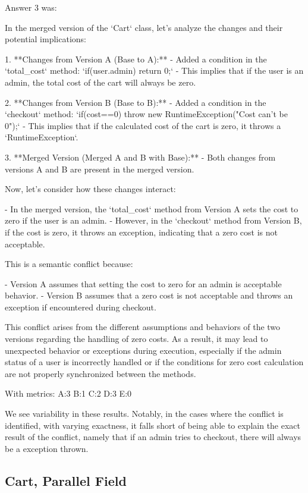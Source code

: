 Answer 3 was:
\begin{spverbatim}
In the merged version of the `Cart` class, let's analyze the changes and their potential implications:

1. **Changes from Version A (Base to A):**
   - Added a condition in the `total_cost` method: `if(user.admin) return 0;`
   - This implies that if the user is an admin, the total cost of the cart will always be zero.

2. **Changes from Version B (Base to B):**
   - Added a condition in the `checkout` method: `if(cost==0) throw new RuntimeException("Cost can't be 0");`
   - This implies that if the calculated cost of the cart is zero, it throws a `RuntimeException`.

3. **Merged Version (Merged A and B with Base):**
   - Both changes from versions A and B are present in the merged version.

Now, let's consider how these changes interact:

- In the merged version, the `total_cost` method from Version A sets the cost to zero if the user is an admin.
- However, in the `checkout` method from Version B, if the cost is zero, it throws an exception, indicating that a zero cost is not acceptable.

This is a semantic conflict because:

- Version A assumes that setting the cost to zero for an admin is acceptable behavior.
- Version B assumes that a zero cost is not acceptable and throws an exception if encountered during checkout.

This conflict arises from the different assumptions and behaviors of the two versions regarding the handling of zero costs. As a result, it may lead to unexpected behavior or exceptions during execution, especially if the admin status of a user is incorrectly handled or if the conditions for zero cost calculation are not properly synchronized between the methods.
\end{spverbatim}

With metrics:
A:3
B:1
C:2
D:3
E:0

We see variability in these results. Notably, in the cases where the conflict is identified, with varying exactness, it falls short of being able to explain the exact result of the conflict, namely that if an admin tries to checkout, there will always be a exception thrown.

\subsection{Cart, Parallel Field}

